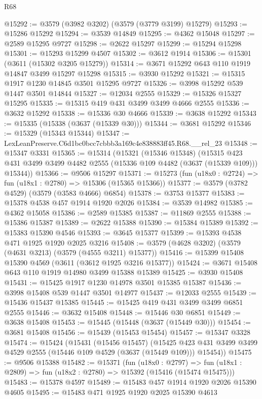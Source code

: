 \begin{lexlean}{R68}
\begin{coremodule}
@15292 := @3579 (@3982 @3202) (@3579 (@3779 @3199) @15279)
@15293 := @15286 @15292
@15294 := @3539 @14849
@15295 := @4362 @15048
@15297 := @2589 @15295 @9727
@15298 := @2622 @15297
@15299 := @15294 @15298
@15301 := @15293 @15299 @4507
@15302 := @3612 @1914
@15306 := @15301 (@3611 (@15302 @3205 @15279))
@15314 := @3671 @15292 @643 @110 @1919 @14847 @3499 @15297 @15298
@15315 := @3930 @15292
@15321 := @15315 @1917 @1230 @14845 @3501 @15295 @9727
@15326 := @3998 @15292 @539 @1447 @3501 @14844
@15327 := @12034 @2555
@15329 := @15326 @15327 @15295
@15335 := @15315 @419 @431 @3499 @3499 @4666 @2555
@15336 := @3632 @15292
@15338 := @15336 @30 @4666
@15339 := @3638 @15292
@15343 := @15335 (@15338 (@3637 (@15339 @30)))
@15344 := @3681 @15292
@15346 := @15329 (@15343 @15344)
@15347 := LexLeanPreserve.C6d1bc0bcc7cbbb3a169c4e838883ff45.R68.__rel_23
@15348 := @15347 @3331
@15365 := @15314
    (@15321
      (@15346 @15348)
      (@15315 @423 @431 @3499 @3499 @4482 @2555 (@15336 @109 @4482 (@3637 (@15339 @109))) @15344))
@15366 := @9506 @15297
@15371 := @15273 (fun (u18x0 : @2724) => fun (u18x1 : @2780) => @15306 (@15365 @15366))
@15377 := @3579 (@3782 @4529) (@3579 (@3583 @4666) @6854)
@15378 := @3753 @15377
@15383 := @15378 @4538 @457 @1914 @1920 @2026
@15384 := @3539 @14982
@15385 := @4362 @15058
@15386 := @2589 @15385
@15387 := @11869 @2555
@15388 := @15386 @15387
@15389 := @2622 @15388
@15390 := @15384 @15389
@15392 := @15383 @15390 @4546
@15393 := @3645 @15377
@15399 := @15393 @4538 @471 @1925 @1920 @2025 @3216
@15408 := @3579 (@4628 @3202) (@3579 (@4631 @3213) (@3579 (@4555 @3211) @15377))
@15416 := @15399 @15408 @15390 @4569 (@3611 (@3612 @1925 @3216 @15377))
@15424 := @3671 @15408 @643 @110 @1919 @14980 @3499 @15388 @15389
@15425 := @3930 @15408
@15431 := @15425 @1917 @1230 @14978 @3501 @15385 @15387
@15436 := @3998 @15408 @539 @1447 @3501 @14977
@15437 := @12033 @2555
@15439 := @15436 @15437 @15385
@15445 := @15425 @419 @431 @3499 @3499 @6851 @2555
@15446 := @3632 @15408
@15448 := @15446 @30 @6851
@15449 := @3638 @15408
@15453 := @15445 (@15448 (@3637 (@15449 @30)))
@15454 := @3681 @15408
@15456 := @15439 (@15453 @15454)
@15457 := @15347 @3328
@15474 := @15424
    (@15431
      (@15456 @15457)
      (@15425 @423 @431 @3499 @3499 @4529 @2555 (@15446 @109 @4529 (@3637 (@15449 @109))) @15454))
@15475 := @9506 @15388
@15482 := @15371
    (fun (u18x0 : @2797) =>
    fun (u18x1 : @2809) => fun (u18x2 : @2780) => @15392 (@15416 (@15474 @15475)))
@15483 := @15378 @4597
@15489 := @15483 @457 @1914 @1920 @2026 @15390 @4605
@15495 := @15483 @471 @1925 @1920 @2025 @15390 @4613

\end{coremodule}
\end{lexlean}

